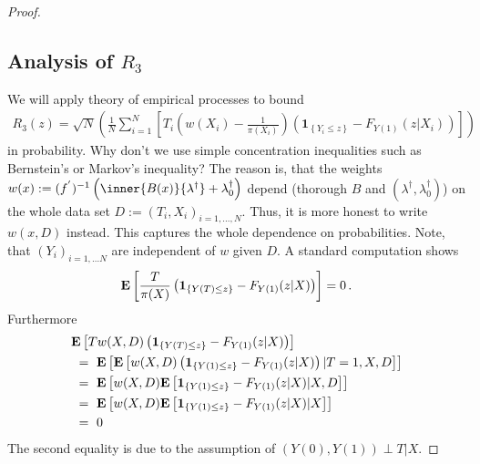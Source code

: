 \begin{proof}
\subsection*{Analysis of $R_3$}
We will apply theory of empirical processes to bound
\begin{gather}
  R_3(z)
  =
  \sqrt{N}
  \left( 
  \frac{1}{N}
    \sum_{i=1}^{N} 
    \left[ 
    T_i
    \left( 
    w(X_i) 
    -
    \frac{1}{\pi(X_i)}
    \right)
    \left( 
    \mathbf{1}_{\left\{ Y_i \le z \right\}}
    -
  F_{Y(1)}(z|X_i)
    \right)
    \right]
  \right)
\end{gather}
in probability. Why don't we use simple concentration inequalities such as Bernstein's  or Markov's inequality? The reason is, that
the weights
$
  w(x)
  :=
  (
  f^{'}
  )^{-1}
  \left( 
    \inner{B(x)}{\lambda^\dagger}
    +
    \lambda_0^\dagger
  \right)
  $
  depend (thorough $B$ and $(\lambda^\dagger,\lambda_0^\dagger)$)
  on the whole data set $D:=(T_i,X_i)_{i=1,\ldots,N}$. Thus, it is more honest to write
  $w(x,D)$ instead. This captures the whole dependence on probabilities. Note, that $(Y_i)_{i=1,\ldots N}$ are independent of $w$ given $D$. 
  A standard computation shows
  \begin{gather}
    \mathbf{E}
    \left[ 
    \frac{T}{\pi(X)}
    \left( 
    \mathbf{1}_{\left\{ Y(T) \le z \right\}}
    -
  F_{Y(1)}(z|X)
    \right)
    \right]
    =0
    \,.
  \end{gather}
  Furthermore
  \begin{align*}
    &
    \E
    \left[ 
      Tw(X,D)
    \left( 
    \mathbf{1}_{\left\{ Y(T) \le z \right\}}
    -
  F_{Y(1)}(z|X)
    \right)
    \right]
    \\
    &
    \ 
    =
    \ 
    \E
    \left[ 
      \E
      \left[ 
      w(X,D)
      \left( 
    \mathbf{1}_{\left\{ Y(1) \le z \right\}}
    -
  F_{Y(1)}(z|X)
      \right)
  |T=1,X,D
      \right]
    \right]
    \\
    &
    \ 
    =
    \ 
    \E
    \left[ 
      w(X,D)
      \E
      \left[ 
    \mathbf{1}_{\left\{ Y(1) \le z \right\}}
    -
  F_{Y(1)}(z|X)
  |X,D
      \right]
    \right]
    \\
    &
    \ 
    =
    \ 
    \E
    \left[ 
      w(X,D)
      \E
      \left[ 
    \mathbf{1}_{\left\{ Y(1) \le z \right\}}
    -
  F_{Y(1)}(z|X)
  |X
      \right]
    \right]
    \\
    &
    \ 
    =
    \ 
    0
  \end{align*}
  The second equality is due to the assumption of $(Y(0),Y(1))\perp T |X$.

\end{proof}
